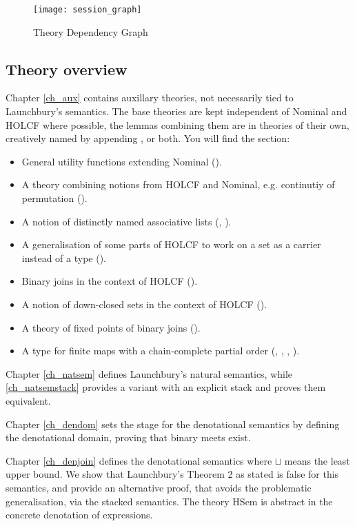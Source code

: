 \documentclass[11pt,a4paper,parskip=half]{scrartcl}
\begin{document}
\begin{figure}
\begin{center}
  \texttt{[image: session\_graph]}
\end{center}
\caption{Theory Dependency Graph\label{theory-deps}}
\end{figure}

\subsection{Theory overview}

Chapter \ref{ch_aux} contains auxillary theories, not necessarily tied to Launchbury's semantics. The base theories are kept independent of Nominal and HOLCF where possible, the lemmas combining them are in theories of their own, creatively named by appending ,  or both.  You will find the section:
\begin{itemize}
\item General utility functions extending Nominal ().
\item A theory combining notions from HOLCF and Nominal, e.g. continutiy of permutation ().
\item A notion of distinctly named associative lists (, ). 
\item A generalisation of some parts of HOLCF to work on a set as a carrier instead of a type ().
\item Binary joins in the context of HOLCF ().
\item A notion of down-closed sets in the context of HOLCF ().
\item A theory of fixed points of binary joins ().
\item A type for finite maps with a chain-complete partial order (, , , ).
\end{itemize}

Chapter \ref{ch_natsem} defines Launchbury's natural semantics, while \ref{ch_natsemstack} provides a variant with an explicit stack and proves them equivalent.

Chapter \ref{ch_dendom} sets the stage for the denotational semantics by defining the denotational domain, proving that binary meets exist.

Chapter \ref{ch_denjoin} defines the denotational semantics where $\sqcup$ means the least upper bound. We show that Launchbury's Theorem 2 as stated is false for this semantics, and provide an alternative proof, that avoids the problematic generalisation, via the stacked semantics. The theory HSem is abstract in the concrete denotation of expressions.
\end{document}
